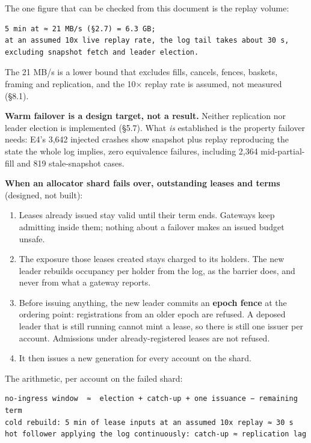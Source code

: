 \documentclass[10pt,a4paper]{article}
\providecommand{\tightlist}{\setlength{\itemsep}{0pt}\setlength{\parskip}{0pt}}
\begin{document}
The one figure that can be checked from this document is the replay volume:

\begin{verbatim}
5 min at ≈ 21 MB/s (§2.7) = 6.3 GB;
at an assumed 10x live replay rate, the log tail takes about 30 s,
excluding snapshot fetch and leader election.
\end{verbatim}

The 21 MB/s is a lower bound that excludes fills, cancels, fences, baskets,
framing and replication, and the 10× replay rate is assumed, not measured (§8.1).

\textbf{Warm failover is a design target, not a result.} Neither replication nor
leader election is implemented (§5.7). What \emph{is} established is the property
failover needs: E4's 3,642 injected crashes show snapshot plus replay reproducing
the state the whole log implies, zero equivalence failures, including 2,364
mid-partial-fill and 819 stale-snapshot cases.

\textbf{When an allocator shard fails over, outstanding leases and terms} (designed,
not built):

\begin{enumerate}
\def\labelenumi{\arabic{enumi}.}
\tightlist
\item
  Leases already issued stay valid until their term ends. Gateways keep
  admitting inside them; nothing about a failover makes an issued budget unsafe.
\item
  The exposure those leases created stays charged to its holders. The new leader
  rebuilds occupancy per holder from the log, as the barrier does, and never from
  what a gateway reports.
\item
  Before issuing anything, the new leader commits an \textbf{epoch fence} at the
  ordering point: registrations from an older epoch are refused. A deposed leader
  that is still running cannot mint a lease, so there is still one issuer per
  account. Admissions under already-registered leases are not refused.
\item
  It then issues a new generation for every account on the shard.
\end{enumerate}

The arithmetic, per account on the failed shard:

\begin{verbatim}
no-ingress window  ≈  election + catch-up + one issuance − remaining term
cold rebuild: 5 min of lease inputs at an assumed 10x replay ≈ 30 s
hot follower applying the log continuously: catch-up ≈ replication lag
\end{verbatim}
\end{document}
